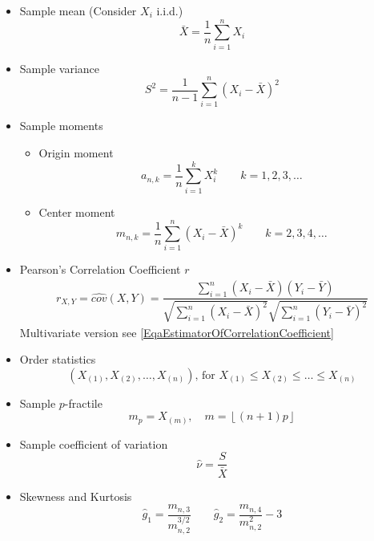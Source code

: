     \begin{itemize}
        \item Sample mean (Consider $X_i$ i.i.d.)
        \begin{equation}
            \bar{X}=\frac{1}{n}\sum_{i=1}^n X_i
        \end{equation}
        \item Sample variance
        \begin{equation}
            S^2=\frac{1}{n-1}\sum_{i=1}^n(X_i-\bar{X})^2  
        \end{equation}
        \item Sample moments
        \begin{itemize}
            \item Origin moment
            \begin{equation}
                a_{n,k}=\frac{1}{n}\sum_{i=1}^k X_i^k\qquad k=1,2,3,\ldots    
            \end{equation}
            \item Center moment
            \begin{equation}
                m_{n,k}=\frac{1}{n}\sum_{i=1}^n (X_i-\bar{X})^k\qquad k=2,3,4,\ldots    
            \end{equation}
        \end{itemize}
        \item Pearson's Correlation Coefficient $ r $
        \begin{align}
            r_{X,Y}=\hat{cov}(X,Y)=\dfrac{\sum_{i=1}^n(X_i-\bar{X})(Y_i-\bar{Y})}{\sqrt{\sum_{i=1}^n(X_i-\bar{X})^2}\sqrt{\sum_{i=1}^n(Y_i-\bar{Y})^2}} 
        \end{align}        
        Multivariate version see \autoref{EqaEstimatorOfCorrelationCoefficient}
        \item Order statistics
        \begin{equation}
            (X_{(1)},X_{(2)},\ldots,X_{(n)}),\,\text{for }X_{(1)}\leq X_{(2)} \leq \ldots\leq X_{(n)}    
        \end{equation}
        \item Sample $p$-fractile
        \begin{equation}
            m_p=X_{(m)},\quad m=\left\lfloor (n+1)p\right\rfloor    
        \end{equation}
        \item Sample coefficient of variation
        \begin{equation}
            \hat{\nu}=\frac{S}{\bar{X}}    
        \end{equation}
        \item Skewness and Kurtosis
        \begin{equation}
            \hat{g}_1=\frac{m_{n,3}}{m_{n,2}^{3/2}}\qquad \hat{g}_2=\frac{m_{n,4}}{m_{n,2}^2}    -3
        \end{equation}
    \end{itemize}

